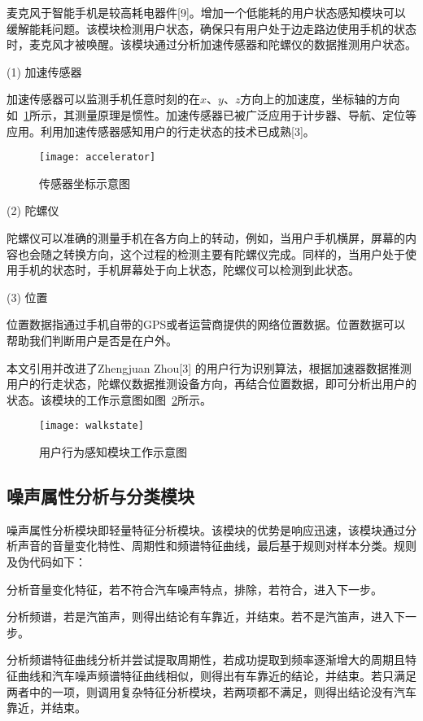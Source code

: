 麦克风于智能手机是较高耗电器件[9]。增加一个低能耗的用户状态感知模块可以缓解能耗问题。该模块检测用户状态，确保只有用户处于边走路边使用手机的状态时，麦克风才被唤醒。该模块通过分析加速传感器和陀螺仪的数据推测用户状态。

(1)	加速传感器

加速传感器可以监测手机任意时刻的在$x、y、z$方向上的加速度，坐标轴的方向如~\ref{fig:accelerator}所示，其测量原理是惯性。加速传感器已被广泛应用于计步器、导航、定位等应用。利用加速传感器感知用户的行走状态的技术已成熟[3]。

\begin{figure}[htbp] %
  \centering
  \texttt{[image: accelerator]}
  \caption{传感器坐标示意图}
  \label{fig:accelerator}
\end{figure}



(2)	陀螺仪

陀螺仪可以准确的测量手机在各方向上的转动，例如，当用户手机横屏，屏幕的内容也会随之转换方向，这个过程的检测主要有陀螺仪完成。同样的，当用户处于使用手机的状态时，手机屏幕处于向上状态，陀螺仪可以检测到此状态。

(3) 位置

位置数据指通过手机自带的GPS或者运营商提供的网络位置数据。位置数据可以帮助我们判断用户是否是在户外。


本文引用并改进了Zhengjuan Zhou[3] 的用户行为识别算法，根据加速器数据推测用户的行走状态，陀螺仪数据推测设备方向，再结合位置数据，即可分析出用户的状态。该模块的工作示意图如图~\ref{fig:walkstate}所示。

\begin{figure}[htbp] %
  \centering
  \texttt{[image: walkstate]}
  \caption{用户行为感知模块工作示意图}
  \label{fig:walkstate}
\end{figure}


\subsection{噪声属性分析与分类模块}

噪声属性分析模块即轻量特征分析模块。该模块的优势是响应迅速，该模块通过分析声音的音量变化特性、周期性和频谱特征曲线，最后基于规则对样本分类。规则及伪代码如下：

\begin{compactenum}
\item 分析音量变化特征，若不符合汽车噪声特点，排除，若符合，进入下一步。
\item 分析频谱，若是汽笛声，则得出结论有车靠近，并结束。若不是汽笛声，进入下一步。
\item 分析频谱特征曲线分析并尝试提取周期性，若成功提取到频率逐渐增大的周期且特征曲线和汽车噪声频谱特征曲线相似，则得出有车靠近的结论，并结束。若只满足两者中的一项，则调用复杂特征分析模块，若两项都不满足，则得出结论没有汽车靠近，并结束。
\end{compactenum}

